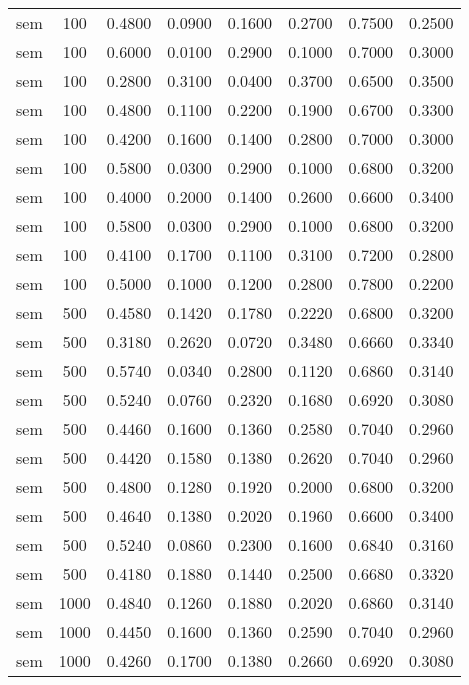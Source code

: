 \begin{scriptsize}
\begin{longtable}{cccccccc}
	sem      & 100  & 0.4800 & 0.0900 & 0.1600 & 0.2700 & 0.7500 & 0.2500 \\
	sem      & 100  & 0.6000 & 0.0100 & 0.2900 & 0.1000 & 0.7000 & 0.3000 \\
	sem      & 100  & 0.2800 & 0.3100 & 0.0400 & 0.3700 & 0.6500 & 0.3500 \\
	sem      & 100  & 0.4800 & 0.1100 & 0.2200 & 0.1900 & 0.6700 & 0.3300 \\
	sem      & 100  & 0.4200 & 0.1600 & 0.1400 & 0.2800 & 0.7000 & 0.3000 \\
	sem      & 100  & 0.5800 & 0.0300 & 0.2900 & 0.1000 & 0.6800 & 0.3200 \\
	sem      & 100  & 0.4000 & 0.2000 & 0.1400 & 0.2600 & 0.6600 & 0.3400 \\
	sem      & 100  & 0.5800 & 0.0300 & 0.2900 & 0.1000 & 0.6800 & 0.3200 \\
	sem      & 100  & 0.4100 & 0.1700 & 0.1100 & 0.3100 & 0.7200 & 0.2800 \\
	sem      & 100  & 0.5000 & 0.1000 & 0.1200 & 0.2800 & 0.7800 & 0.2200 \\
	sem      & 500  & 0.4580 & 0.1420 & 0.1780 & 0.2220 & 0.6800 & 0.3200 \\
	sem      & 500  & 0.3180 & 0.2620 & 0.0720 & 0.3480 & 0.6660 & 0.3340 \\
	sem      & 500  & 0.5740 & 0.0340 & 0.2800 & 0.1120 & 0.6860 & 0.3140 \\
	sem      & 500  & 0.5240 & 0.0760 & 0.2320 & 0.1680 & 0.6920 & 0.3080 \\
	sem      & 500  & 0.4460 & 0.1600 & 0.1360 & 0.2580 & 0.7040 & 0.2960 \\
	sem      & 500  & 0.4420 & 0.1580 & 0.1380 & 0.2620 & 0.7040 & 0.2960 \\
	sem      & 500  & 0.4800 & 0.1280 & 0.1920 & 0.2000 & 0.6800 & 0.3200 \\
	sem      & 500  & 0.4640 & 0.1380 & 0.2020 & 0.1960 & 0.6600 & 0.3400 \\
	sem      & 500  & 0.5240 & 0.0860 & 0.2300 & 0.1600 & 0.6840 & 0.3160 \\
	sem      & 500  & 0.4180 & 0.1880 & 0.1440 & 0.2500 & 0.6680 & 0.3320 \\
	sem      & 1000 & 0.4840 & 0.1260 & 0.1880 & 0.2020 & 0.6860 & 0.3140 \\
	sem      & 1000 & 0.4450 & 0.1600 & 0.1360 & 0.2590 & 0.7040 & 0.2960 \\
	sem      & 1000 & 0.4260 & 0.1700 & 0.1380 & 0.2660 & 0.6920 & 0.3080 \\

\end{longtable}
\end{scriptsize}

